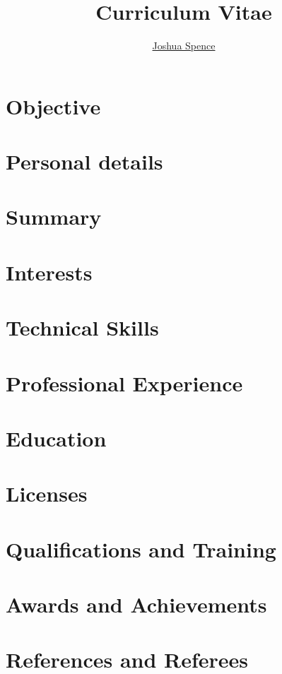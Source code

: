 \documentclass{article}
\title{\Huge{\textbf{Curriculum Vitae}}}
\author{\Large{\underline{Joshua Spence}}}
\date{}
\begin{document}
\maketitle

\section*{Objective}


\section*{Personal details}


\section*{Summary}


\section*{Interests}


\section*{Technical Skills}


\section*{Professional Experience}


\section*{Education}


\section*{Licenses}


\section*{Qualifications and Training}


\section*{Awards and Achievements}


\section*{References and Referees}

\end{document}
